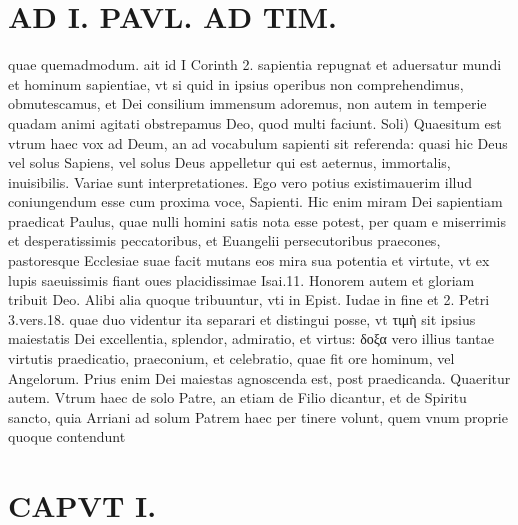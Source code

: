 \documentclass{article}
\begin{document}
\begin{pages}
\section*{AD I. PAVL. AD TIM. }
\marginpar{[ p.32 ]}\pstart quae quemadmodum. ait id I Corinth 2. sapientia repugnat et aduersatur mundi et hominum sapientiae, vt si quid in ipsius operibus non comprehendimus, obmutescamus, et Dei consilium immensum adoremus, non autem in temperie quadam animi agitati obstrepamus Deo, quod multi faciunt. Soli) Quaesitum est vtrum haec vox ad Deum, an ad vocabulum sapienti sit referenda: quasi hic Deus vel solus Sapiens, vel solus Deus appelletur qui est aeternus, immortalis, inuisibilis. Variae sunt interpretationes. Ego vero potius existimauerim illud coniungendum esse cum proxima voce, Sapienti. Hic enim miram Dei sapientiam praedicat Paulus, quae nulli homini satis nota esse potest, per quam e miserrimis et desperatissimis peccatoribus, et Euangelii persecutoribus praecones, pastoresque Ecclesiae suae facit mutans eos mira sua potentia et virtute, vt ex lupis saeuissimis fiant oues placidissimae Isai.11. Honorem autem et gloriam tribuit Deo. Alibi alia quoque tribuuntur, vti in Epist. Iudae in fine et 2. Petri 3.vers.18. quae duo videntur ita separari et distingui posse, vt τιμὴ sit ipsius maiestatis Dei excellentia, splendor, admiratio, et virtus: δοξα vero illius tantae virtutis praedicatio, praeconium, et celebratio, quae fit ore hominum, vel Angelorum. Prius enim Dei maiestas agnoscenda est, post praedicanda. Quaeritur autem. Vtrum haec de solo Patre, an etiam de Filio dicantur, et de Spiritu sancto, quia Arriani ad solum Patrem haec per tinere volunt, quem vnum proprie quoque contendunt  \pend
\section*{CAPVT  I. }
\marginpar{[ p.33 ]}\pstart {}
{}

\end{pages}
\end{document}
